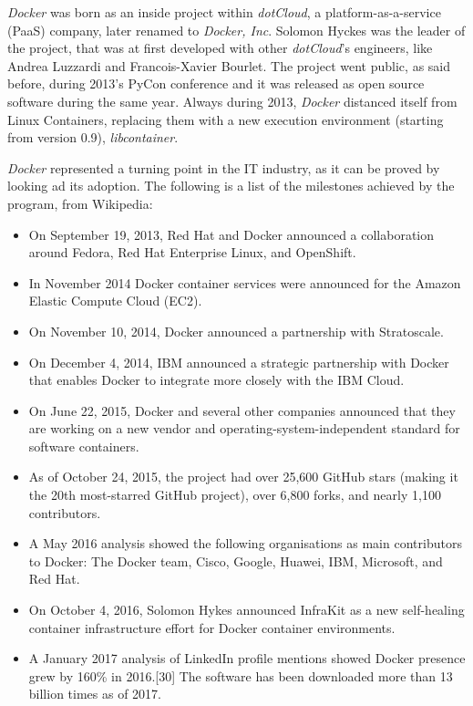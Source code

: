 \documentclass[a4paper,12pt]{article}
\begin{document}
\textit{Docker} was born as an inside project within \textit{dotCloud}, a
platform-as-a-service (PaaS) company, later renamed to \textit{Docker, Inc}.
Solomon Hyckes\cite{solomon_hyckes_wiki} was the leader of the project, that was
at first developed with other \textit{dotCloud}'s engineers, like Andrea
Luzzardi and Francois-Xavier Bourlet. The project went public, as said before,
during 2013's PyCon conference and it was released as open source software
during the same year. Always during 2013, \textit{Docker} distanced itself from
Linux Containers, replacing them with a new execution environment (starting from
version 0.9), \textit{libcontainer}.\par \textit{Docker} represented a turning
point in the IT industry, as it can be proved by looking ad its adoption. The
following is a list of the milestones achieved by the program, from
Wikipedia\cite{docker_history_wiki}:
\begin{itemize}
  \item On September 19, 2013, Red Hat and Docker announced a collaboration
  around Fedora, Red Hat Enterprise Linux, and OpenShift.
  \item In November 2014 Docker container services were announced for the Amazon
  Elastic Compute Cloud (EC2).
  \item On November 10, 2014, Docker announced a partnership with
  Stratoscale.
  \item On December 4, 2014, IBM announced a strategic partnership with Docker
  that enables Docker to integrate more closely with the IBM Cloud.
  \item On June 22, 2015, Docker and several other companies announced that they
  are working on a new vendor and operating-system-independent standard for
  software containers.
  \item As of October 24, 2015, the project had over 25,600 GitHub stars (making
  it the 20th most-starred GitHub project), over 6,800 forks, and nearly 1,100
  contributors.
  \item A May 2016 analysis showed the following organisations as main
  contributors to Docker: The Docker team, Cisco, Google, Huawei, IBM,
  Microsoft, and Red Hat.
  \item On October 4, 2016, Solomon Hykes announced InfraKit as a new
  self-healing container infrastructure effort for Docker container
  environments.
  \item A January 2017 analysis of LinkedIn profile mentions showed Docker
  presence grew by 160\% in 2016.[30] The software has been downloaded more than
  13 billion times as of 2017.

\end{itemize}   
\end{document}
